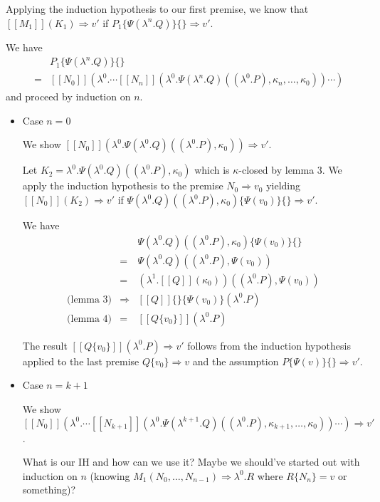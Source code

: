 \documentclass[a4paper,11pt]{article}
\begin{document}
\begin{itemize}
Applying the induction hypothesis to our first premise, we know that $[\![M_{1}]\!](K_{1}) \Rightarrow v'$ if $P_{1}\{\Psi(\lambda^{n}.Q)\}\{\} \Rightarrow v'$.

We have
\begin{eqnarray*}
&   & P_{1}\{\Psi(\lambda^{n}.Q)\}\{\} \\
& = & [\![N_{0}]\!](\lambda^{0}. \cdots [\![N_{n}]\!](\lambda^{0}.\Psi(\lambda^{n}.Q)((\lambda^{0}.P), \kappa_{n}, \ldots, \kappa_{0})) \cdots )
\end{eqnarray*}
and proceed by induction on $n$.

\begin{itemize}
\item{Case $n = 0$}

We show $[\![N_{0}]\!](\lambda^{0}.\Psi(\lambda^{0}.Q)((\lambda^{0}.P), \kappa_{0})) \Rightarrow v'$.

Let $K_{2} = \lambda^{0}.\Psi(\lambda^{0}.Q)((\lambda^{0}.P), \kappa_{0})$ which is $\kappa$-closed by lemma 3. We apply the induction hypothesis to the premise $N_{0} \Rightarrow v_{0}$ yielding $[\![N_{0}]\!](K_{2}) \Rightarrow v'$ if $\Psi(\lambda^{0}.Q)((\lambda^{0}.P), \kappa_{0})\{\Psi(v_{0})\}\{\} \Rightarrow v'$.

We have
\begin{eqnarray*}
 &   & \Psi(\lambda^{0}.Q)((\lambda^{0}.P), \kappa_{0})\{\Psi(v_{0})\}\{\} \\
 & = & \Psi(\lambda^{0}.Q)((\lambda^{0}.P), \Psi(v_{0})) \\
 & = & (\lambda^{1}.[\![Q]\!](\kappa_{0}))((\lambda^{0}.P), \Psi(v_{0})) \\
\mbox{(lemma 3)} & \Rightarrow & [\![Q]\!]\{\}\{\Psi(v_{0})\} (\lambda^{0}.P) \\
\mbox{(lemma 4)} & = & [\![Q\{v_{0}\}]\!] (\lambda^{0}.P)
\end{eqnarray*}

The result $[\![Q\{v_{0}\}]\!] (\lambda^{0}.P) \Rightarrow v'$
follows from the induction hypothesis applied to the last premise
$Q\{v_{0}\} \Rightarrow v$ and the assumption $P\{\Psi(v)\}\{\}
\Rightarrow v'$.


\item{Case $n = k + 1$}

We show $[\![N_{0}]\!](\lambda^{0}. \cdots [\![N_{k+1}]\!](\lambda^{0}.\Psi(\lambda^{k+1}.Q)((\lambda^{0}.P), \kappa_{k+1}, \ldots, \kappa_{0})) \cdots ) \Rightarrow v'$.

What is our IH and how can we use it? Maybe we should've started out with induction on $n$ (knowing $M_{1}(N_{0}, \ldots, N_{n-1}) \Rightarrow \lambda^{0}.R$ where $R\{N_{n}\} = v$ or something)?



\end{itemize}
\end{itemize}
\end{document}
